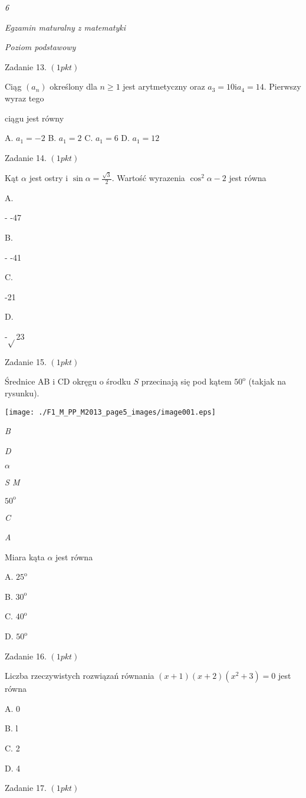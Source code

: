 \documentclass[a4paper,12pt]{article}
\begin{document}
{\it 6}

{\it Egzamin maturalny z matematyki}

{\it Poziom podstawowy}

Zadanie 13. $(1pkt)$

Ciąg $(a_{n})$ określony dla $n\geq 1$ jest arytmetyczny oraz $a_{3}=10 \mathrm{i}a_{4}=14$. Pierwszy wyraz tego

ciągu jest równy

A. $a_{1}=-2$ B. $a_{1}=2$ C. $a_{1}=6$ D. $a_{1}=12$

Zadanie 14. $(1pkt)$

Kąt $\alpha$ jest ostry i $\displaystyle \sin\alpha=\frac{\sqrt{3}}{2}$. Wartość wyrazenia $\cos^{2}\alpha-2$ jest równa

A.

- -47

B.

- -41

C.

-21

D.

-$\sqrt{}$23

Zadanie 15. $(1pkt)$

Średnice AB $\mathrm{i}$ CD okręgu o środku $S$ przecinają się pod kątem $50^{\mathrm{o}}$ (takjak na rysunku).
\begin{center}
\texttt{[image: ./F1\_M\_PP\_M2013\_page5\_images/image001.eps]}
\end{center}
{\it B}

{\it D}

$\alpha$

{\it S  M}

$50^{\mathrm{o}}$

{\it C}

{\it A}

Miara kąta $\alpha$ jest równa

A. $25^{\mathrm{o}}$

B. $30^{\mathrm{o}}$

C. $40^{\mathrm{o}}$

D. $50^{\mathrm{o}}$

Zadanie 16. $(1pkt)$

Liczba rzeczywistych rozwiązań równania $(x+1)(x+2)(x^{2}+3)=0$ jest równa

A. 0

B. l

C. 2

D. 4

Zadanie 17. $(1pkt)$
\end{document}
